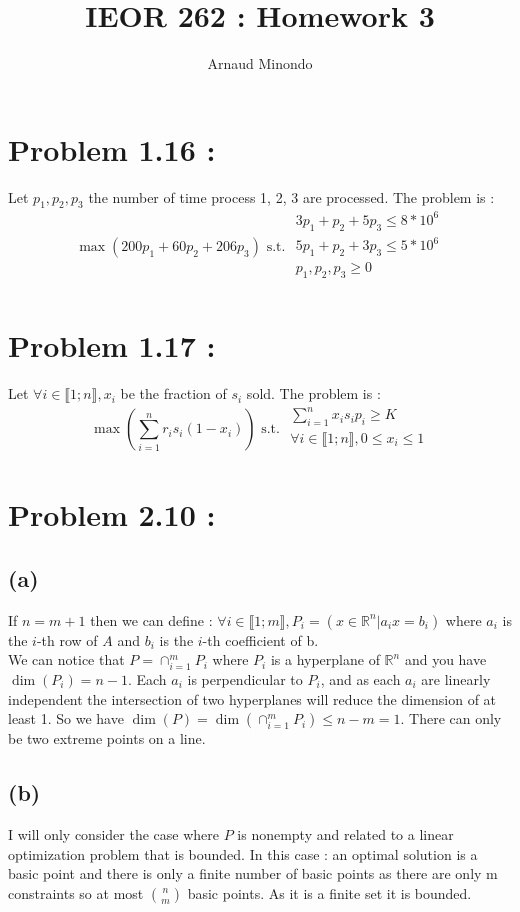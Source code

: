 \documentclass{article}
\title{IEOR 262 : Homework 3}
\author{Arnaud Minondo}
\begin{document}
\maketitle
\section*{Problem 1.16 :}
Let $p_1,p_2,p_3$ the number of time process 1, 2, 3 are processed.
The problem is : $$\boxed{\max(200p_1+60p_2+206p_3) \text{ s.t. }\begin{array}{c}
    3p_1+p_2+5p_3 \leq 8*10^6 \\
    5p_1+p_2+3p_3\leq 5*10^6 \\
    p_1,p_2,p_3 \ge 0 \\
\end{array} }$$

\section*{Problem 1.17 :}
Let $\forall i \in\llbracket 1;n\rrbracket, x_i$ be the fraction of $s_i$ sold.
The problem is : $$\boxed{\max\left(\sum\limits_{i=1}^n r_is_i(1-x_i)\right) \text{ s.t. } \begin{array}{c}
    \sum\limits_{i=1}^n{x_is_ip_i} \ge K\\
    \forall i \in \llbracket 1;n\rrbracket, 0\leq x_i\leq 1\\
    
\end{array}}$$
\section*{Problem 2.10 :}
\subsection*{(a)}
If $n = m+1$ then we can define : $\forall i \in \llbracket 1;m \rrbracket, P_i = (x\in\mathbb{R}^n| a_i x = b_i)$ where $a_i$ is the $i$-th row of $A$ and $b_i$ is the $i$-th coefficient of b.
\\
We can notice that $P = \cap_{i=1}^m P_i$ where $P_i$ is a hyperplane
 of $\mathbb{R}^n$ and you have $\dim(P_i) = n-1$. Each $a_i$ is perpendicular
 to $P_i$, and as each $a_i$ are linearly independent the intersection of two
 hyperplanes will reduce the dimension of at least 1. So we have $\dim(P) = \dim(\cap_{i=1}^mP_i)\leq n-m = 1$.
 There can only be two extreme points on a line.
\subsection*{(b)}
I will only consider the case where $P$ is nonempty and related to a linear optimization problem that is bounded.
 In this case : an optimal solution is a basic point and there is only a
 finite number of basic points as there are only m constraints so at most $\binom{n}{m}$ basic points. As it is a finite set it is bounded.
\end{document}
